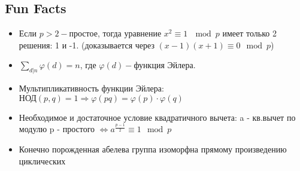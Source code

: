 \documentclass[11pt,a4paper]{article}
\begin{document}
		\subsection*{ Fun Facts}
		\begin{itemize}
		\item Если $ p > 2 - \text{простое}$, тогда уравнение $x^2 \equiv 1 \ \mod{p}$ имеет только 2 решения: 1 и -1. (доказывается через $(x - 1)(x + 1) \equiv 0 \mod{p} $)
		\item $\sum_{d|n}\varphi(d) = n$, где $\varphi(d) -$функция Эйлера.
		\item Мультипликативность функции Эйлера: $\text{НОД}(p, q) = 1 \Rightarrow \varphi(pq) = \varphi(p) \cdot \varphi(q)$
		\item Необходимое и достаточное условие  квадратичного вычета: a - кв.вычет по модулю p - простого $\Leftrightarrow a^{\frac{p - 1}{2}} \equiv 1 \mod{p}$ 
		\item Конечно порожденная абелева группа изоморфна прямому произведению циклических
		
		\end{itemize} 
\end{document}
